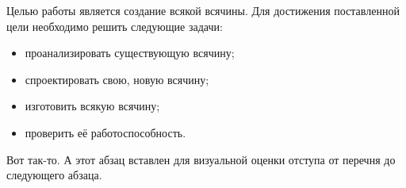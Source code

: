\Introduction

Целью работы является создание всякой всячины. Для достижения поставленной цели необходимо решить следующие задачи:

\begin{itemize}
\item проанализировать существующую всячину;
\item спроектировать свою, новую всячину;
\item изготовить всякую всячину;
\item проверить её работоспособность.
\end{itemize}

Вот так-то. А этот абзац вставлен для визуальной оценки отступа от перечня до следующего абзаца.